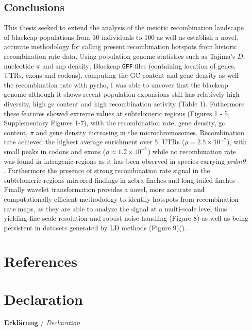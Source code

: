 \documentclass[12pt,a4paper]{article}
\begin{document}
\subsection{Conclusions}
This thesis seeked to extend the analysis of the meiotic recombination landscape of blackcap
populations from 30 individuals \parencite{bascon-cardozo-fine-scale-2024} to 100 as well as
establish a novel, accurate methodology for calling present recombination hotspots from historic
recombination rate data. Using population genome statistics such as Tajima's $D$,
nucleotide $\pi$ and snp density; Blackcap \texttt{GFF} files (containing location of genes,
UTRs, exons and codons), computing the GC content and gene density as well the recombination rate
with pyrho, I was able to uncover that the blackcap genome although it shows recent population expansions
still has relatively high diversity, high gc content and high recombination activity (Table 1). Futhermore
these features showed extreme values at subtelomeric regions (Figures 1 - 5, Supplementary Figures
1-7), with the recombination rate, gene density, gc content, $\pi$ and gene density increasing in the microchromosomes.
Recombination rate achieved the highest average enrichment over 5' UTRs ($\rho = 2.5 \times 10^{-7}$),
with small peaks in codons and exons ($\rho \approx 1.2 \times 10^{-7}$) while no recombination rate
was found in intragenic regions as it has been observed in species carrying \textit{prdm9}
\parencite{wooldridge_rapid_2023, lange_landscape_2016, baker_prdm9_2015}. Furthermore the presence
of strong recombination rate signal in the subtelomeric regions mirrored findings in zebra finches
and long tailed finches \parencite{singhal_2015}. Finally wavelet transformation provides a novel,
more accurate and computationally efficient methodology to identify hotspots from recombination rate
maps, as they are able to analyze the signal at a multi-scale level thus yielding fine scale
resolution and robust noise handling (Figure 8) as well as being persistent in datasets generated by
LD methods (Figure 9)(\parencite{singhal_2015}).
\section{References}

\printbibliography[heading=none]
\newpage
\section{Declaration}
 {\large \textbf{Erklärung} \; / \; \textit{Declaration}}\\[0.8cm]
\end{document}
